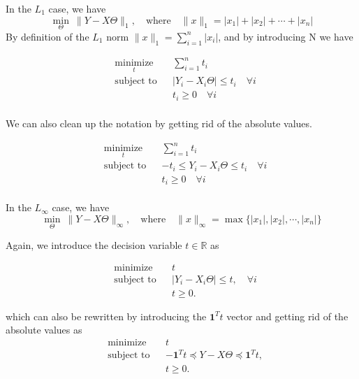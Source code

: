 \documentclass{article}
\begin{document}
In the $L_1$ case, we have  	
$$ \min_\Theta  \  \lVert Y - X \Theta \rVert_1, \quad \text{where} \quad \lVert x \rVert_1 = |x_1| + |x_2| + \cdots + |x_n| $$
By definition of the $L_1$ norm $\lVert x \rVert_1 = \sum_{i=1}^n |x_i|$, and by introducing N we have

\begin{equation*}
\begin{aligned}
& \underset{t}{\text{minimize}}
& & \sum_{i=1}^n t_i \\
& \text{subject to}
& & |Y_i - X_i \Theta |\leq t_i \quad \forall i\\
&&& t_i \geq 0  \quad \forall i  \\
\end{aligned}
\end{equation*}

We can also clean up the notation by getting rid of the absolute values.

\begin{equation*}
\begin{aligned}
& \underset{t}{\text{minimize}}
& & \sum_{i=1}^n t_i \\
& \text{subject to}
& & -t_i \leq Y_i - X_i \Theta \leq t_i \quad \forall i\\
&&& t_i \geq 0  \quad \forall i  \\
\end{aligned}
\end{equation*}




In the $L_\infty$ case, we have 
$$ \min_\Theta  \  \lVert Y - X \Theta \rVert_\infty , \quad \text{where} \quad \lVert x \rVert _\infty  = \max \{ |x_1|, |x_2|,\cdots , |x_n| \} $$

Again, we introduce the decision variable $t \in \mathbb{R}$ as 

\begin{equation*}
\begin{aligned}
& {\text{minimize}}
& & t \\
& \text{subject to}
& & | Y_i - X_i \Theta | \leq t, \quad \forall i \\
&&& t \geq 0.
\end{aligned}
\end{equation*}


which can also be rewritten by introducing the $\textbf{1}^T t$ vector and getting rid of the absolute values as 
\begin{equation*}
\begin{aligned}
& {\text{minimize}}
& & t \\
& \text{subject to}
& & -\textbf{1}^T t \preccurlyeq Y - X\Theta  \preccurlyeq \textbf{1}^T t,  \\
&&& t \geq 0.
\end{aligned}
\end{equation*}
\end{document}
